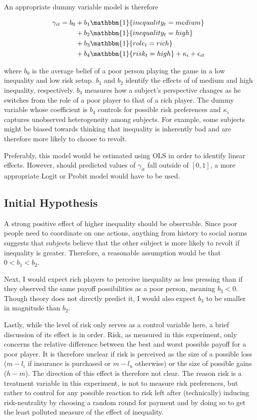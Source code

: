 \documentclass[12pt]{article}
\begin{document}
	An appropriate dummy variable model is therefore
	
	\begin{align*}
		\gamma_{it} = b_0 &+ b_1\mathbbm{1}\{inequality_t=medium\}\\
		&+ b_2\mathbbm{1}\{inequality_t=high\}\\
		&+ b_3\mathbbm{1}\{role_t=rich\}\\
		&+ b_4\mathbbm{1}\{risk_t=high\} + \kappa_i + \epsilon_{it}
	\end{align*}
	
	where $b_0$ is the average belief of a poor person playing the game in a 
	low inequality and low risk setup. $b_1$ and $b_2$ identify the effects of 
	of medium and high inequality, respectively. $b_3$ measures how a subject's 
	perspective changes as he switches from the role of a poor player to that 
	of a rich player. The dummy variable whose coefficient is $b_4$ controls 
	for possible risk preferences and $\kappa_i$ captures unobserved 
	heterogeneity among subjects. For example, some subjects might be biased 
	towards thinking that inequality is inherently bad and are therefore more 
	likely to choose to revolt.
	
	Preferably, this model would be estimated using OLS in order to identify 
	linear effects. However, should predicted values of $\gamma_{it}$ fall 
	outside of $[0,1]$, a more appropriate Logit or Probit model would have to 
	be used.
	
	\subsection{Initial Hypothesis}
	A strong positive effect of higher inequality should be observable. Since 
	poor people need to coordinate on one actions, anything from history to 
	social norms suggests that subjects believe that the other subject is more 
	likely to revolt if inequality is greater. Therefore, a reasonable 
	assumption would be that $0<b_1<b_2$.
	
	Next, I would expect rich players to perceive inequality as less pressing 
	than if they observed the same payoff possibilities as a poor person, 
	meaning $b_3<0$. Though theory does not directly predict it, I would also 
	expect $b_3$ to be smaller in magnitude than $b_2$.
	
	Lastly, while the level of risk only serves as a control variable here, a 
	brief discussion of its effect is in order. Risk, as measured in this 
	experiment, only concerns the relative difference between the best and 
	worst possible payoff for a poor player. It is therefore unclear if risk is 
	perceived as the size of a possible loss ($m-l_i$ if insurance is purchased 
	or $m-l_n$ otherwise) or the size of possible gains ($h-m$). The direction 
	of this effect is therefore not clear. The reason risk is a treatment 
	variable in this experiment, is not to measure risk preferences, but rather 
	to control for any possible reaction to risk left after (technically) 
	inducing risk-neutrality by choosing a random round for payment and by 
	doing so to get the least polluted measure of the effect of inequality.
	
\end{document}
